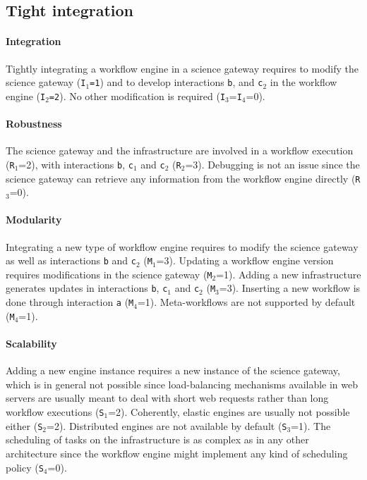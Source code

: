 \documentclass[preprint,3p,twocolumn]{elsarticle}
\begin{document}


\subsection{Tight integration}

\paragraph{Integration} Tightly integrating a workflow engine in a
science gateway requires to modify the science gateway
(\texttt{I$_1$=1}) and to develop interactions \texttt{b}, and
\texttt{c$_2$} in the workflow engine (\texttt{I$_2$=2}). No other
modification is required (\texttt{I$_3$}=\texttt{I$_4$}=0).

\paragraph{Robustness} The science gateway and the infrastructure are
involved in a workflow execution (\texttt{R$_1$}=2), with interactions
\texttt{b}, \texttt{c$_1$} and \texttt{c$_2$}
(\texttt{R$_2$}=3). Debugging is not an issue since the science
gateway can retrieve any information from the workflow engine
directly (\texttt{R$_3$}=0). 

\paragraph{Modularity} Integrating a new type of workflow engine
requires to modify the science gateway as well as interactions
\texttt{b} and \texttt{c$_2$} (\texttt{M$_1$}=3). Updating a workflow
engine version requires modifications in the science gateway
(\texttt{M$_2$}=1). Adding a new infrastructure generates updates in
interactions \texttt{b}, \texttt{c$_1$} and \texttt{c$_2$}
(\texttt{M$_3$}=3). Inserting a new workflow is done through
interaction \texttt{a} (\texttt{M$_4$}=1). Meta-workflows are not
supported by default (\texttt{M$_4$}=1).

\paragraph{Scalability} Adding a new engine instance requires a new
instance of the science gateway, which is in general not possible
since load-balancing mechanisms available in web servers are usually
meant to deal with short web requests rather than long workflow
executions (\texttt{S$_1$}=2). Coherently, elastic engines are usually
not possible either (\texttt{S$_2$}=2).  Distributed engines are not
available by default (\texttt{S$_3$}=1). The scheduling of tasks on
the infrastructure is as complex as in any other architecture since
the workflow engine might implement any kind of scheduling policy
(\texttt{S$_4$}=0).
\end{document}

